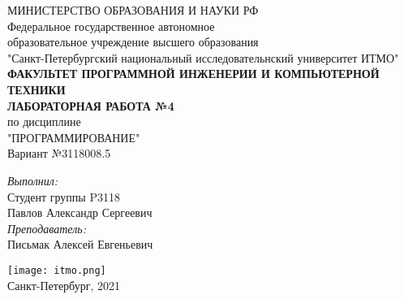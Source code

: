 \thispagestyle{empty}

\begin{center}
\large{
	МИНИСТЕРСТВО ОБРАЗОВАНИЯ И НАУКИ РФ\\
\vspace{1em}
	Федеральное государственное автономное\\
	образовательное учреждение высшего образования\\
"Санкт-Петербургский национальный исследовательнский университет ИТМО"
\\ \vspace{1em}
\textbf{ФАКУЛЬТЕТ ПРОГРАММНОЙ ИНЖЕНЕРИИ И КОМПЬЮТЕРНОЙ ТЕХНИКИ}\\
\vspace{10em}
\textbf{ЛАБОРАТОРНАЯ РАБОТА №4}\\
по дисциплине\\
"ПРОГРАММИРОВАНИЕ"\\
Вариант №3118008.5
\vspace{1em}
\vspace{10em}
	\begin{flushright}
	\textit{Выполнил:}\\
	Студент группы P3118\\
	Павлов Александр Сергеевич\\
	\textit{Преподаватель:}\\
	Письмак Алексей Евгеньевич\\
	\end{flushright}
\vspace{2em}
\texttt{[image: itmo.png]}\\
Санкт-Петербург, 2021
}
\end{center}
